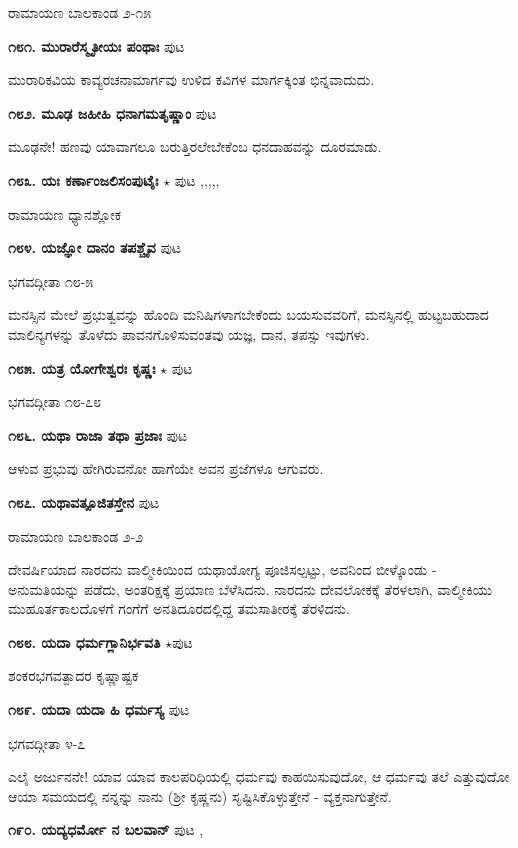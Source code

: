 \hfill ರಾಮಾಯಣ ಬಾಲಕಾಂಡ ೨-೧೫

\medskip
\noindent\textbf{೧೮೧. ಮುರಾರೆಸ್ಮೃತೀಯಃ ಪಂಥಾಃ} \hfill ಪುಟ \pageref{43}

ಮುರಾರಿಕವಿಯ ಕಾವ್ಯರಚನಾಮಾರ್ಗವು ಉಳಿದ ಕವಿಗಳ ಮಾರ್ಗಕ್ಕಿಂತ ಭಿನ್ನವಾದುದು.

\medskip
\noindent\textbf{೧೮೨. ಮೂಢ ಜಹೀಹಿ ಧನಾಗಮತೃಷ್ಣಾಂ} \hfill ಪುಟ \pageref{55a}

ಮೂಢನೇ! ಹಣವು ಯಾವಾಗಲೂ ಬರುತ್ತಿರಲೇಬೇಕೆಂಬ ಧನದಾಹವನ್ನು ದೂರಮಾಡು.

\medskip
\noindent\textbf{೧೮೩. ಯಃ ಕರ್ಣಾಂಜಲಿಸಂಪುಟೈಃ} $\star$  \hfill ಪುಟ \pageref{152},\pageref{168a},\pageref{181b},\pageref{208a},\pageref{211e},\pageref{244a}

\hfill ರಾಮಾಯಣ ಧ್ಯಾನಶ್ಲೋಕ 

\medskip
\noindent\textbf{೧೮೪. ಯಜ್ಞೋ ದಾನಂ ತಪಶ್ಚೈವ} \hfill ಪುಟ \pageref{172}

\hfill ಭಗವದ್ಗೀತಾ ೧೮-೫

ಮನಸ್ಸಿನ ಮೇಲೆ ಪ್ರಭುತ್ವವನ್ನು ಹೊಂದಿ ಮನಿಷಿಗಳಾಗಬೇಕೆಂದು ಬಯಸುವವರಿಗೆ, ಮನಸ್ಸಿನಲ್ಲಿ ಹುಟ್ಟಬಹುದಾದ ಮಾಲಿನ್ಯಗಳನ್ನು ತೊಳೆದು ಪಾವನಗೊಳಿಸುವಂತವು ಯಜ್ಞ, ದಾನ, ತಪಸ್ಸು ಇವುಗಳು.

\medskip
\noindent\textbf{೧೮೫. ಯತ್ರ ಯೋಗೇಶ್ವರಃ ಕೃಷ್ಣಃ} $\star$ \hfill ಪುಟ \pageref{92a}

\hfill ಭಗವದ್ಗೀತಾ ೧೮-೭೮

\medskip
\noindent\textbf{೧೮೬. ಯಥಾ ರಾಜಾ ತಥಾ ಪ್ರಜಾಃ} \hfill ಪುಟ \pageref{225c}

ಆಳುವ ಪ್ರಭುವು ಹೇಗಿರುವನೋ ಹಾಗೆಯೇ ಅವನ ಪ್ರಜೆಗಳೂ ಆಗುವರು.

\medskip
\noindent\textbf{೧೮೭. ಯಥಾವತ್ಪೂಜಿತಸ್ತೇನ} \hfill ಪುಟ \pageref{197}

\hfill ರಾಮಾಯಣ ಬಾಲಕಾಂಡ ೨-೨

ದೇವರ್ಷಿಯಾದ ನಾರದನು ವಾಲ್ಮೀಕಿಯಿಂದ ಯಥಾಯೋಗ್ಯ ಪೂಜಿಸಲ್ಪಟ್ಟು, ಅವನಿಂದ ಬೀಳ್ಕೊಂಡು - ಅನುಮತಿಯನ್ನು ಪಡೆದು, ಅಂತರಿಕ್ಷಕ್ಕೆ ಪ್ರಯಾಣ ಬೆಳೆಸಿದನು. ನಾರದನು ದೇವಲೋಕಕ್ಕೆ  ತೆರಳಲಾಗಿ, ವಾಲ್ಮೀಕಿಯು ಮುಹೂರ್ತಕಾಲದೊಳಗೆ ಗಂಗೆಗೆ ಅನತಿದೂರದಲ್ಲಿದ್ದ ತಮಸಾತೀರಕ್ಕೆ ತೆರಳಿದನು.

\medskip
\noindent\textbf{೧೮೮. ಯದಾ ಧರ್ಮಗ್ಲಾನಿರ್ಭವತಿ} $\star$\hfill ಪುಟ \pageref{150b}

\hfill ಶಂಕರಭಗವತ್ಪಾದರ ಕೃಷ್ಣಾಷ್ಟಕ

\medskip
\noindent\textbf{೧೮೯. ಯದಾ ಯದಾ ಹಿ ಧರ್ಮಸ್ಯ} \hfill ಪುಟ \pageref{226a}

\hfill ಭಗವದ್ಗೀತಾ ೪-೭

ಎಲೈ ಅರ್ಜುನನೇ! ಯಾವ ಯಾವ ಕಾಲಪರಿಧಿಯಲ್ಲಿ ಧರ್ಮವು ಕಾಹಯಿಸುವುದೋ, ಆ ಧರ್ಮವು ತಲೆ  ಎತ್ತುವುದೋ ಆಯಾ ಸಮಯದಲ್ಲಿ ನನ್ನನ್ನು ನಾನು (ಶ್ರೀ ಕೃಷ್ಣನು) ಸೃಷ್ಟಿಸಿಕೊಳ್ಳುತ್ತೇನೆ - ವ್ಯಕ್ತನಾಗುತ್ತೇನೆ.

\medskip
\noindent\textbf{೧೯೦. ಯದ್ಯಧರ್ಮೋ ನ ಬಲವಾನ್} \hfill ಪುಟ \pageref{192b},\pageref{215}

